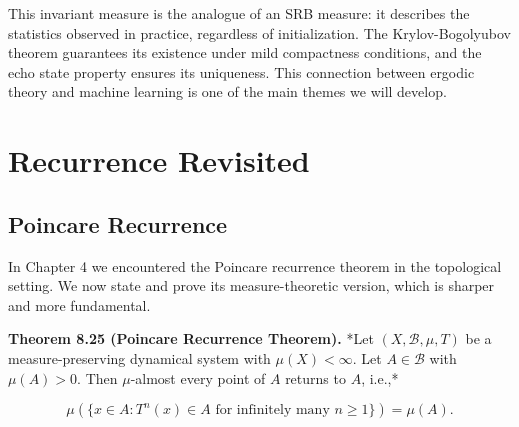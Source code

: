 This invariant measure is the analogue of an SRB measure: it describes the statistics observed in practice, regardless of initialization. The Krylov-Bogolyubov theorem guarantees its existence under mild compactness conditions, and the echo state property ensures its uniqueness. This connection between ergodic theory and machine learning is one of the main themes we will develop.


\bigskip


\section{Recurrence Revisited}\label{sec:8.5}

\subsection{Poincare Recurrence}\label{sec:8.5.1}

In Chapter 4 we encountered the Poincare recurrence theorem in the topological setting. We now state and prove its measure-theoretic version, which is sharper and more fundamental.

\textbf{Theorem 8.25 (Poincare Recurrence Theorem).} *Let $(X, \mathcal{B}, \mu, T)$ be a measure-preserving dynamical system with $\mu(X) < \infty$. Let $A \in \mathcal{B}$ with $\mu(A) > 0$. Then $\mu$-almost every point of $A$ returns to $A$, i.e.,*

\[
\mu\left(\{x \in A : T^n(x) \in A \text{ for infinitely many } n \ge 1\}\right) = \mu(A).
\]

